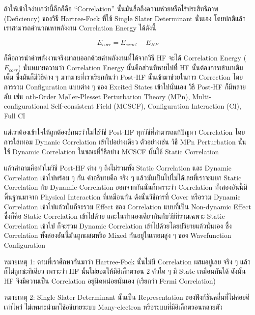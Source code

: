 ถ้าให้เข้าใจง่ายกว่านี้อีกก็คือ \enquote{Correlation} นั้นมันสื่อถึงความห่วยหรือไร้ประสิทธิภาพ (Deficiency) ของวิธี Hartree-Fock ที่ใช้
Single Slater Determinant นั่นเอง โดยปกติแล้วเราสามารถคำนวณหาพลังงาน Correlation Energy ได้ดังนี้

\begin{equation}
  E_{corr} = E_{exact} - E_{HF}
\end{equation}

\noindent ก็คือการนำค่าพลังงานจริงมาลบออกด้วยค่าพลังงานที่ได้จากวิธี HF จะได้ Correlation Energy ($E_{corr}$) นั่นหมายความว่า
Correlation Energy นั้นคือส่วนที่หายไปที่ HF นั้นต้องการเข้ามาเติมเต็ม ซึ่งมันก็มีวิธีต่าง ๆ มากมายที่เราเรียกกันว่า Post-HF นั้นเข้ามาช่วยในการ
Correction โดยการรวม Configuration แบบต่าง ๆ ของ Excited States เข้าไปนั่นเอง วิธี Post-HF ก็มีหลายอัน เช่น $n$th-Order
Møller-Plesset Perturbation Theory (MPn), Multi-configurational Self-consistent Field (MCSCF), Configuration
Interaction (CI), Full CI

แต่เราต้องเข้าใจให้ถูกต้องอีกนะว่าไม่ใช่วิธี Post-HF ทุกวิธีที่สามารถแก้ปัญหา Correlation โดยการใส่เทอม Dynanic Correlation เข้าไปอย่างเดียว
ตัวอย่างเช่น วิธี MPn Perturbation นั้นใช้ Dynamic Correlation ในขณะที่วิธีอย่าง MCSCF นั้นใช้ Static Correlation

แล้วคำถามคือทำไมวิธี Post-HF ต่าง ๆ ถึงไม่รวมทั้ง Static Correlation และ Dynamic Correlation เข้าไปพร้อม ๆ กัน
คำอธิบายคือ จริง ๆ แล้วมันเป็นไปไม่ได้เลยที่เราจะแยก Static Correlation กับ Dynamic Correlation ออกจากกันนั่นก็เพราะว่า Correlation
ทั้งสองอันนี้มีพื้นฐานมาจาก Physical Interaction ที่เหมือนกัน ดังนั้นวิธีการที่ Cover หรือรวม Dynamic Correlation เข้าไปแล้วนั้นก็จะรวม
Effect ของ Correlation แบบที่เป็น Non-dynamic Effect ซึ่งก็คือ Static Correlation เข้าไปด้วย และในทำนองเดียวกันกับวิธีที่รวมเฉพาะ
Static Correlation เข้าไป ก็จะรวม Dynamic Correlation เข้าไปด้วยโดยปริยายแล้วนั่นเอง ซึ่ง Correlation ทั้งสองอันนี้มันถูกผสมหรือ
Mixed กันอยู่ในเทอมสูง ๆ ของ Wavefunction Configuration

\noindent หมายเหตุ 1: ตามที่เราศึกษากันมาว่า Hartree-Fock นั้นไม่มี Correlation ผสมอยู่เลย จริง ๆ แล้วก็ไม่ถูกซะทีเดียว เพราะว่า HF
นั้นไม่ยอมให้มีอิเล็กตรอน 2 ตัวใด ๆ มี State เหมือนกันได้ ดังนั้น HF จึงมีความเป็น Correlation อยู่นิดหน่อยนั่นเอง (เรียกว่า Fermi Correlation)

\noindent หมายเหตุ 2: Single Slater Determinant นั้นเป็น Representation ของฟังก์ชันคลื่นที่ไม่ค่อยดีเท่าไหร่
ไม่เหมาะนำมาใช้อธิบายระบบ Many-electron หรือระบบที่มีอิเล็กตรอนหลายตัว


